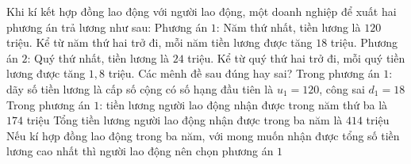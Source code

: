 \begin{ex}%
	Khi kí kết hợp đồng lao động với người lao động, một doanh nghiệp để xuất hai phương  án trả lương như sau: Phương án $1$: Năm thứ nhất, tiền lương là $120$ triệu. Kể từ năm thứ hai trở đi, mỗi năm tiền lương được tăng $18$ triệu. Phương án $2$: Quý thứ nhất, tiền lương là $24$ triệu. Kể từ quý thứ hai trở đi, mỗi quý tiền lương được tăng $1{,}8$ triệu. Các mênh đề sau đúng hay sai?
	\choiceTF 
		{\True Trong phương  án $1$: dãy số tiền lương là cấp số cộng có số hạng đầu tiên là $u_1=120$, công sai $d_1=18$}
		{Trong phương  án $1$: tiền lương người lao động nhận được trong năm thứ ba là $174$ triệu}
		{\True Tổng tiền lương người lao động nhận được trong ba năm là $414$  triệu}
		{\True Nếu kí hợp đồng lao động trong ba năm, với mong muốn nhận được tổng số tiền lương cao  nhất thì người lao động nên chọn phương án $1$}
\end{ex}

